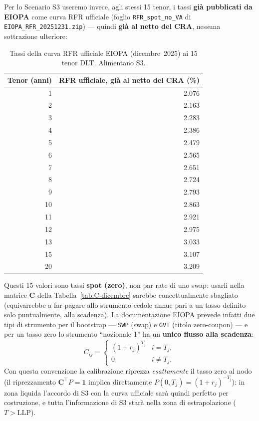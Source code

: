 \documentclass[11pt,a4paper]{article}
\theoremstyle{remark}
\newcommand{\LLP}{\ensuremath{\mathrm{LLP}}}
\newcommand{\transp}{^{\!\top}}
\begin{document}


Per lo Scenario S3 useremo invece, agli stessi 15 tenor, i tassi \textbf{gi\`a pubblicati da
EIOPA} come curva RFR ufficiale (foglio \texttt{RFR\_spot\_no\_VA} di
\texttt{EIOPA\_RFR\_20251231.zip}) --- quindi \textbf{gi\`a al netto del CRA}, nessuna
sottrazione ulteriore:

\begin{table}[H]
\centering
\small
\begin{tabular}{rr}
\toprule
Tenor (anni) & RFR ufficiale, gi\`a al netto del CRA (\%) \\
\midrule
1  & 2.076 \\
2  & 2.163 \\
3  & 2.283 \\
4  & 2.386 \\
5  & 2.479 \\
6  & 2.565 \\
7  & 2.651 \\
8  & 2.724 \\
9  & 2.793 \\
10 & 2.863 \\
11 & 2.921 \\
12 & 2.975 \\
13 & 3.033 \\
15 & 3.107 \\
20 & 3.209 \\
\bottomrule
\end{tabular}
\caption{Tassi della curva RFR ufficiale EIOPA (dicembre~2025) ai 15 tenor DLT. Alimentano
S3.}
\label{tab:input-rfr}
\end{table}

Questi 15 valori sono tassi \textbf{spot (zero)}, non par rate di uno swap: usarli nella
matrice $\mathbf{C}$ della Tabella~\ref{tab:C-dicembre} sarebbe concettualmente sbagliato
(equivarrebbe a far pagare allo strumento cedole annue pari a un tasso definito solo
puntualmente, alla scadenza). La documentazione EIOPA prevede infatti due tipi di strumento
per il bootstrap --- \texttt{SWP} (swap) e \texttt{GVT} (titolo zero-coupon) --- e per un
tasso zero lo strumento ``nozionale 1'' ha un \textbf{unico flusso alla scadenza}:
\[
  C_{ij} = \begin{cases}
    (1+r_j)^{T_j} & i = T_j,\\
    0             & i \neq T_j.
  \end{cases}
\]
Con questa convenzione la calibrazione riprezza \emph{esattamente} il tasso zero al nodo (il
riprezzamento $\mathbf{C}\transp P=\mathbf{1}$ implica direttamente
$P(0,T_j)=(1+r_j)^{-T_j}$): in zona liquida l'accordo di S3 con la curva ufficiale sar\`a
quindi perfetto per costruzione, e tutta l'informazione di S3 star\`a nella zona di
estrapolazione ($T>\LLP$).
\end{document}
